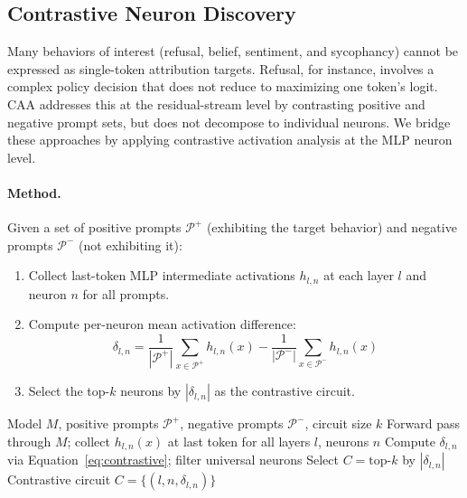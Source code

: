\documentclass[11pt]{article}
\begin{document}
\subsection{Contrastive Neuron Discovery}
\label{sec:contrastive}

Many behaviors of interest (refusal, belief, sentiment, and sycophancy) cannot be expressed as single-token attribution targets.
Refusal, for instance, involves a complex policy decision that does not reduce to maximizing one token's logit.
CAA \citep{rimsky2024steering} addresses this at the residual-stream level by contrasting positive and negative prompt sets, but does not decompose to individual neurons.
We bridge these approaches by applying contrastive activation analysis at the MLP neuron level.

\paragraph{Method.}
Given a set of positive prompts $\mathcal{P}^+$ (exhibiting the target behavior) and negative prompts $\mathcal{P}^-$ (not exhibiting it):

\begin{enumerate}[leftmargin=2em]
    \item Collect last-token MLP intermediate activations $h_{l,n}$ at each layer $l$ and neuron $n$ for all prompts.
    \item Compute per-neuron mean activation difference:
    \begin{equation}
        \delta_{l,n} = \frac{1}{|\mathcal{P}^+|} \sum_{x \in \mathcal{P}^+} h_{l,n}(x) - \frac{1}{|\mathcal{P}^-|} \sum_{x \in \mathcal{P}^-} h_{l,n}(x)
        \label{eq:contrastive}
    \end{equation}
    \item Select the top-$k$ neurons by $|\delta_{l,n}|$ as the contrastive circuit.
\end{enumerate}

\begin{algorithm}[h]
\caption{Contrastive Neuron Discovery}
\label{alg:contrastive}
\begin{algorithmic}[1]
\REQUIRE Model $M$, positive prompts $\mathcal{P}^+$, negative prompts $\mathcal{P}^-$, circuit size $k$
    \STATE Forward pass through $M$; collect $h_{l,n}(x)$ at last token for all layers $l$, neurons $n$
\ENDFOR
\STATE Compute $\delta_{l,n}$ via Equation~\ref{eq:contrastive}; filter universal neurons
\STATE Select $C = \text{top-}k$ by $|\delta_{l,n}|$
\RETURN Contrastive circuit $C = \{(l, n, \delta_{l,n})\}$
\end{algorithmic}
\end{algorithm}
\end{document}
